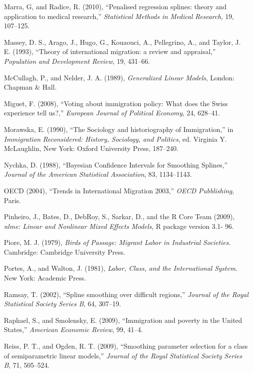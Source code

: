 \documentclass[10pt] {article}
\theoremstyle{definition}
\theoremstyle{plain}
\begin{document}
\begin{thebibliography}{99}
\bibitem{} Marra, G, and Radice, R. (2010), ``Penalised regression splines: theory and application to medical research,'' \textit{Statistical Methods in Medical Research}, 19, 107--125.

\bibitem{} Massey, D. S., Arago, J., Hugo, G., Kouaouci, A., Pellegrino, A., and Taylor, J. E. (1993), ``Theory of international migration: a review and appraisal,'' \textit{Population and Development Review}, 19, 431--66.

\bibitem{} McCullagh, P., and Nelder, J. A. (1989), \textit{Generalized Linear Models}, London: Chapman $\&$ Hall.

\bibitem{} Miguet, F. (2008), ``Voting about immigration policy: What does the Swiss experience tell us?,'' \textit{European Journal of Political Economy}, 24, 628--41.

\bibitem{} Morawska, E. (1990), ``The Sociology and historiography of Immigration,'' in \textit{Immigration Reconsidered: History, Sociology, and Politics}, ed. Virginia Y. McLaughlin, New York: Oxford University Press, 187--240.

\bibitem{} Nychka, D. (1988), ``Bayesian Confidence Intervals for Smoothing Splines,'' \textit{Journal of the American Statistical Association}, 83, 1134--1143.

\bibitem{} OECD (2004), ``Trends in International Migration 2003,'' \textit{OECD Pubblishing}, Paris.

\bibitem{} Pinheiro, J., Bates, D., DebRoy, S., Sarkar, D., and the R Core Team (2009), \textit{nlme: Linear and Nonlinear Mixed Effects Models}, R package version 3.1- 96.

\bibitem{} Piore, M. J. (1979), \textit{Birds of Passage: Migrant Labor in Industrial Societies}. Cambridge: Cambridge University Press.

\bibitem{} Portes, A., and Walton, J. (1981), \textit{Labor, Class, and the International System}. New York: Academic Press.

\bibitem{} Ramsay, T. (2002), ``Spline smoothing over difficult regions,'' \textit{Journal of the Royal Statistical Society Series B}, 64, 307--19.

\bibitem{} Raphael, S., and Smolensky, E. (2009), ``Immigration and poverty in the United States,'' \textit{American Economic Review}, 99, 41--4.

\bibitem{} Reiss, P. T., and Ogden, R. T. (2009), ``Smoothing parameter selection for a class of semiparametric linear models,'' \textit{Journal of the Royal Statistical Society Series B}, 71, 505--524.


\end{thebibliography}
\end{document}
